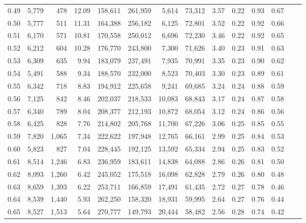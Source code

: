 \begin{tabular}{rrrrrrrrrrrrrr}
0.49 &  5,779 &    478 &    12.09 &  158,611 &  261,959 &   5,614 &  73,312 &  3.57 &  0.22 &  0.93 &      0.67 \\
0.50 &  5,777 &    511 &    11.31 &  164,388 &  256,182 &   6,125 &  72,801 &  3.52 &  0.22 &  0.92 &      0.66 \\
0.51 &  6,170 &    571 &    10.81 &  170,558 &  250,012 &   6,696 &  72,230 &  3.46 &  0.22 &  0.92 &      0.65 \\
0.52 &  6,212 &    604 &    10.28 &  176,770 &  243,800 &   7,300 &  71,626 &  3.40 &  0.23 &  0.91 &      0.63 \\
0.53 &  6,309 &    635 &     9.94 &  183,079 &  237,491 &   7,935 &  70,991 &  3.35 &  0.23 &  0.90 &      0.62 \\
0.54 &  5,491 &    588 &     9.34 &  188,570 &  232,000 &   8,523 &  70,403 &  3.30 &  0.23 &  0.89 &      0.61 \\
0.55 &  6,342 &    718 &     8.83 &  194,912 &  225,658 &   9,241 &  69,685 &  3.24 &  0.24 &  0.88 &      0.59 \\
0.56 &  7,125 &    842 &     8.46 &  202,037 &  218,533 &  10,083 &  68,843 &  3.17 &  0.24 &  0.87 &      0.58 \\
0.57 &  6,340 &    789 &     8.04 &  208,377 &  212,193 &  10,872 &  68,054 &  3.12 &  0.24 &  0.86 &      0.56 \\
0.58 &  6,425 &    828 &     7.76 &  214,802 &  205,768 &  11,700 &  67,226 &  3.06 &  0.25 &  0.85 &      0.55 \\
0.59 &  7,820 &  1,065 &     7.34 &  222,622 &  197,948 &  12,765 &  66,161 &  2.99 &  0.25 &  0.84 &      0.53 \\
0.60 &  5,823 &    827 &     7.04 &  228,445 &  192,125 &  13,592 &  65,334 &  2.94 &  0.25 &  0.83 &      0.52 \\
0.61 &  8,514 &  1,246 &     6.83 &  236,959 &  183,611 &  14,838 &  64,088 &  2.86 &  0.26 &  0.81 &      0.50 \\
0.62 &  8,093 &  1,260 &     6.42 &  245,052 &  175,518 &  16,098 &  62,828 &  2.79 &  0.26 &  0.80 &      0.48 \\
0.63 &  8,659 &  1,393 &     6.22 &  253,711 &  166,859 &  17,491 &  61,435 &  2.72 &  0.27 &  0.78 &      0.46 \\
0.64 &  8,539 &  1,440 &     5.93 &  262,250 &  158,320 &  18,931 &  59,995 &  2.64 &  0.27 &  0.76 &      0.44 \\
0.65 &  8,527 &  1,513 &     5.64 &  270,777 &  149,793 &  20,444 &  58,482 &  2.56 &  0.28 &  0.74 &      0.42 \\

\end{tabular}
